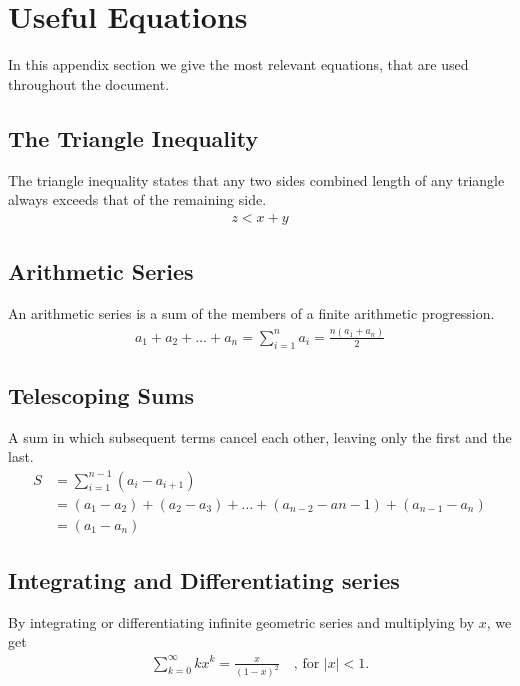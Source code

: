 
\thispagestyle{fancyplain}

\chapter{Useful Equations}
\label{appendix:equations}
In this appendix section we give the most relevant equations, that are used
throughout the document.

\section{The Triangle Inequality}
\label{appendix:equations|eqn:triangle-inequality}
The triangle inequality states that any two sides combined length of any
triangle always exceeds that of the remaining side.
\begin{align}
	z < x + y
\end{align}

\section{Arithmetic Series}
\label{appendix:equations|eqn:arithmetic-series}
An arithmetic series is a sum of the members of a finite arithmetic
progression.
\begin{align}
	a_1 + a_2 + \dots + a_n = \sum_{i=1}^{n}a_i = \frac{n(a_1 + a_n)}{2}
\end{align}

\section{Telescoping Sums}
\label{appendix:equations|eqn:telescoping}
A sum in which subsequent terms cancel each other, leaving only the first and
the last.
\begin{align}
	S &= \sum_{i=1}^{n-1}(a_{i} - a_{i+1}) \\
	&= (a_1-a_2)+(a_2-a_3) + \dots + (a_{n-2}-a{n-1}) + (a_{n-1}-a_n)
	\nonumber \\
	&= (a_1 - a_n) \nonumber
\end{align}

\section{Integrating and Differentiating series}
\label{appendix:equations|eqn:intdiff-series}
By integrating or differentiating infinite geometric series and multiplying by
$x$, we get
\begin{align}
	\sum_{k=0}^{\infty} kx^k = \frac{x}{(1 - x)^2}
	\quad \text{, for } |x| < 1 \text{.}
\end{align}

